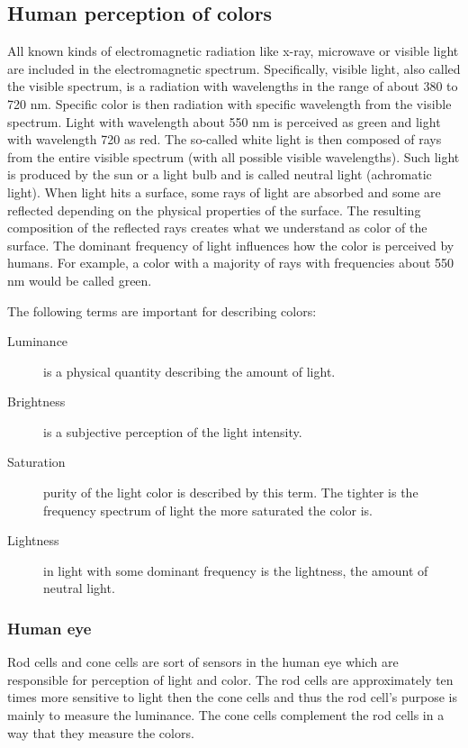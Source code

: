 \documentclass[thesis=B,english]{FITthesis}[2019/12/23]
\begin{document}
        \subsection{Human perception of colors}
            All known kinds of electromagnetic radiation like x-ray, microwave or visible light are included in the electromagnetic spectrum. Specifically, visible light, also called the visible spectrum, is a radiation with wavelengths in the range of about 380 to 720 nm. Specific color is then radiation with specific wavelength from the visible spectrum. Light with wavelength about 550 nm is perceived as green and light with wavelength 720 as red. The so-called white light is then composed of rays from the entire visible spectrum (with all possible visible wavelengths). Such light is produced by the sun or a light bulb and is called neutral light (achromatic light). When light hits a surface, some rays of light are absorbed and some are reflected depending on the physical properties of the surface. The resulting composition of the reflected rays creates what we understand as color of the surface. The dominant frequency of light influences how the color is perceived by humans. For example, a color with a majority of rays with frequencies about 550 nm would be called green.

            The following terms are important for describing colors:
            
            \begin{description}
                \item[Luminance] is a physical quantity describing the amount of light.
                \item[Brightness] is a subjective perception of the light intensity.
                \item[Saturation] purity of the light color is described by this term. The tighter is the frequency spectrum of light the more saturated the color is.
                \item[Lightness] in light with some dominant frequency is the lightness, the amount of neutral light.
            \end{description}
            
            \subsubsection*{Human eye}
            Rod cells and cone cells are sort of sensors in the human eye which are responsible for perception of light and color. The rod cells are approximately ten times more sensitive to light then the cone cells and thus the rod cell's purpose is mainly to measure the luminance. The cone cells complement the rod cells in a way that they measure the colors.
            
\end{document}
